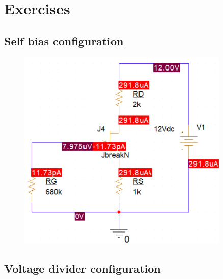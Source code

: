 \section{Exercises}
\subsection{Self bias configuration}
\begin{figure}[h]
    \centering
    \includegraphics[width=0.9\textwidth]{graphics/ex1/f1.PNG}
\end{figure}

\subsection{Voltage divider configuration}